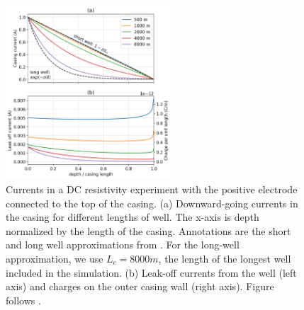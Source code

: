 \begin{figure}[!htb]
    \begin{center}
    \includegraphics[width=0.55\textwidth]{figures/finite-wells.png}
    \end{center}
\caption{
    Currents in a DC resistivity experiment with the positive electrode connected to the top of the casing.
    (a) Downward-going currents in the casing for different lengths of well. The x-axis is depth normalized by the length of the casing.
    Annotations are the short and long well approximations from \cite{Kaufman1993}. For the long-well approximation, we use $L_c = 8000m$, the length of the longest well included in the simulation.
    (b) Leak-off currents from the well (left axis) and charges on the outer casing wall (right axis).
    Figure follows \cite{Heagy2019a}.
}
\label{fig:finite-wells}
\end{figure}
